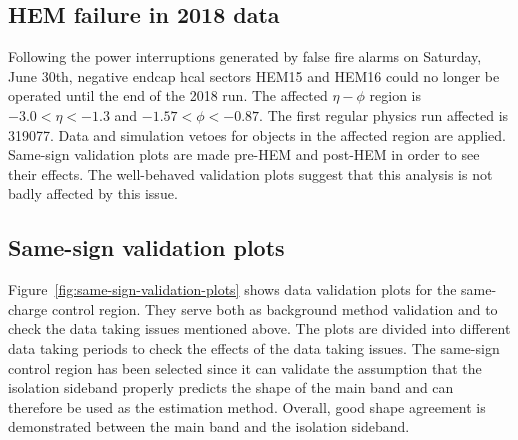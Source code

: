 \subsection{HEM failure in 2018 data}

Following the power interruptions generated by false fire alarms on Saturday, June 30th, negative endcap \gls{hcal} sectors HEM15 and HEM16 could no longer be operated until the end of the 2018 run. The affected $\eta-\phi$ region is $-3.0<\eta<-1.3$ and $-1.57<\phi<-0.87$. The first regular physics run affected is 319077. Data and simulation vetoes for objects in the affected region are applied. Same-sign validation plots are made pre-HEM and post-HEM in order to see their effects. The well-behaved validation plots suggest that this analysis is not badly affected by this issue.

\subsection{Same-sign validation plots}
\label{sec:same-sign-validation-plots}

Figure~\ref{fig:same-sign-validation-plots} shows data validation plots for the same-charge control region. They serve both as background method validation and to check the data taking issues mentioned above. The plots are divided into different data taking periods to check the effects of the data taking issues. The same-sign control region has been selected since it can validate the assumption that the isolation sideband properly predicts the shape of the main band and can therefore be used as the estimation method. Overall, good shape agreement is demonstrated between the main band and the isolation sideband.

